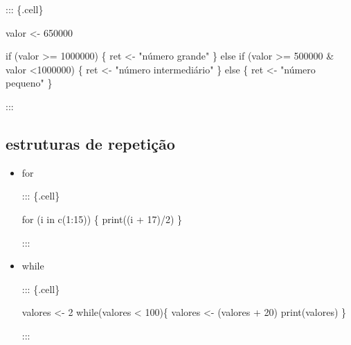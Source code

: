 \documentclass[
  letterpaper,
  DIV=11,
  numbers=noendperiod]{scrreprt}
\newenvironment{Shaded}{\begin{snugshade}}{\end{snugshade}}
\newcommand{\ControlFlowTok}[1]{\textcolor[rgb]{0.00,0.23,0.31}{#1}}
\newcommand{\DecValTok}[1]{\textcolor[rgb]{0.68,0.00,0.00}{#1}}
\newcommand{\FunctionTok}[1]{\textcolor[rgb]{0.28,0.35,0.67}{#1}}
\newcommand{\NormalTok}[1]{\textcolor[rgb]{0.00,0.23,0.31}{#1}}
\newcommand{\OtherTok}[1]{\textcolor[rgb]{0.00,0.23,0.31}{#1}}
\newcommand{\SpecialCharTok}[1]{\textcolor[rgb]{0.37,0.37,0.37}{#1}}
\newcommand{\StringTok}[1]{\textcolor[rgb]{0.13,0.47,0.30}{#1}}
\begin{document}
\begin{itemize}
  ::: \{.cell\}

\begin{Shaded}
\begin{Highlighting}[]
\NormalTok{valor }\OtherTok{\textless{}{-}} \DecValTok{650000}

\ControlFlowTok{if}\NormalTok{ (valor }\SpecialCharTok{\textgreater{}=} \DecValTok{1000000}\NormalTok{) \{}
\NormalTok{    ret }\OtherTok{\textless{}{-}} \StringTok{"número grande"}
\NormalTok{\} }\ControlFlowTok{else} \ControlFlowTok{if}\NormalTok{ (valor }\SpecialCharTok{\textgreater{}=} \DecValTok{500000} \SpecialCharTok{\&}\NormalTok{ valor }\SpecialCharTok{\textless{}}\DecValTok{1000000}\NormalTok{) \{}
\NormalTok{    ret }\OtherTok{\textless{}{-}} \StringTok{"número intermediário"}
\NormalTok{\} }\ControlFlowTok{else}\NormalTok{ \{}
\NormalTok{    ret }\OtherTok{\textless{}{-}} \StringTok{"número pequeno"}
\NormalTok{\}}
\end{Highlighting}
\end{Shaded}

  :::
\end{itemize}

\hypertarget{estruturas-de-repetiuxe7uxe3o}{%
\subsection{estruturas de
repetição}\label{estruturas-de-repetiuxe7uxe3o}}

\begin{itemize}
\item
  for

  ::: \{.cell\}

\begin{Shaded}
\begin{Highlighting}[]
\ControlFlowTok{for}\NormalTok{ (i }\ControlFlowTok{in} \FunctionTok{c}\NormalTok{(}\DecValTok{1}\SpecialCharTok{:}\DecValTok{15}\NormalTok{)) \{}
    \FunctionTok{print}\NormalTok{((i }\SpecialCharTok{+} \DecValTok{17}\NormalTok{)}\SpecialCharTok{/}\DecValTok{2}\NormalTok{)}
\NormalTok{\}}
\end{Highlighting}
\end{Shaded}

  :::
\item
  while

  ::: \{.cell\}

\begin{Shaded}
\begin{Highlighting}[]
\NormalTok{valores }\OtherTok{\textless{}{-}} \DecValTok{2}
\ControlFlowTok{while}\NormalTok{(valores }\SpecialCharTok{\textless{}} \DecValTok{100}\NormalTok{)\{}
\NormalTok{    valores }\OtherTok{\textless{}{-}}\NormalTok{ (valores }\SpecialCharTok{+} \DecValTok{20}\NormalTok{)}
    \FunctionTok{print}\NormalTok{(valores)}
\NormalTok{\}}
\end{Highlighting}
\end{Shaded}

  :::
\end{itemize}
\end{document}
